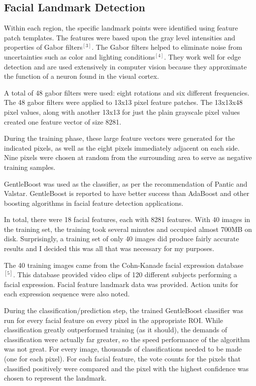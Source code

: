 \documentclass[13pt,letterpaper]{scrartcl}
\begin{document}
	\subsection{Facial Landmark Detection}
	Within each region, the specific landmark points were identified using feature patch templates. The features were based upon the gray level intensities and properties of Gabor filters$^{[3]}$. The Gabor filters helped to eliminate noise from uncertainties such as color and lighting conditions$^{[4]}$. They work well for edge detection and are used extensively in computer vision because they approximate the function of a neuron found in the visual cortex.
	
	A total of 48 gabor filters were used: eight rotations and six different frequencies. The 48 gabor filters were applied to 13x13 pixel feature patches. The 13x13x48 pixel values, along with another 13x13 for just the plain grayscale pixel values created one feature vector of size 8281.
	
	During the training phase, these large feature vectors were generated for the indicated pixels, as well as the eight pixels immediately adjacent on each side. Nine pixels were chosen at random from the surrounding area to serve as negative training samples.
	
	GentleBoost was used as the classifier, as per the recommendation of Pantic and Valstar. GentleBoost is reported to have better success than AdaBoost and other boosting algorithms in facial feature detection applications.
	
	In total, there were 18 facial features, each with 8281 features. With 40 images in the training set, the training took several minutes and occupied almost 700MB on disk. Surprisingly, a training set of only 40 images did produce fairly accurate results and I decided this was all that was necessary for my purposes.
	
	The 40 training images came from the Cohn-Kanade facial expression
database$^{[5]}$. This database provided video clips of 120 different subjects performing a facial expression. Facial feature landmark data was provided. Action units for each expression sequence were also noted.

	During the classification/prediction step, the trained GentleBoost classifier was run for every facial feature on every pixel in the appropriate ROI. While classification greatly outperformed training (as it should), the demands of classification were actually far greater, so the speed performance of the algorithm was not great. For every image, thousands of classifications needed to be made (one for each pixel). For each facial feature, the vote counts for the pixels that classified positively were compared and the pixel with the highest confidence was chosen to represent the landmark.
		
\end{document}
